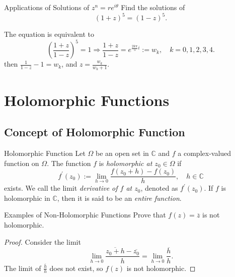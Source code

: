 \begin{example}{Applications of Solutions of $z^n = re^{i\theta}$}{}
  Find the solutions of
  \begin{equation}
    (1+z)^5 = (1-z)^5.
  \end{equation}
\end{example}

\begin{solution}
  The equation is equivalent to 
  \begin{equation}
    \left( \frac{1+z}{1-z} \right)^5 = 1 \Rightarrow
    \frac{1+z}{1-z} = e^{\frac{2k\pi}{5}i} := w_k, \quad k = 0,1,2,3,4.
  \end{equation}
  then $\frac{1}{1-z} - 1 = w_k$, and $z = \frac{w_k}{w_k + 1}$.
\end{solution}

\section{Holomorphic Functions}

\subsection{Concept of Holomorphic Function}

\begin{definition}{Holomorphic Function}{}
  Let $\Omega$ be an open set in $\mathbb{C}$ and $f$ a complex-valued function
  on $\Omega$. The function $f$ is \emph{holomorphic at $z_0 \in \Omega$} if
  \begin{equation}
    f^{\prime}(z_0) := \lim \limits _{h \rightarrow 0}\frac{f(z_0 + h) - f(z_0)}{h}, \quad h \in \mathbb{C}
  \end{equation}
  exists. We call the limit \emph{derivative of $f$ at $z_0$}, denoted as $f^{\prime}(z_0)$.
  If $f$ is holomorphic in $\mathbb{C}$, then it is said to be an \emph{entire function}.
\end{definition}

\begin{example}{Examples of Non-Holomorphic Functions}{}
  Prove that $f(z) = \overline{z}$ is not holomorphic.
\end{example}

\begin{proof}
  Consider the limit
  \begin{equation}
    \lim \limits _{h \rightarrow 0} \frac{ \overline{z_0 + h} - \overline{z_0}}{h}
    = \lim \limits _{h \rightarrow 0}\frac{\overline{h}}{h}.
  \end{equation}
  The limit of $\frac{\overline{h}}{h}$ does not exist, so $f(z)$ is not holomorphic.
\end{proof}

